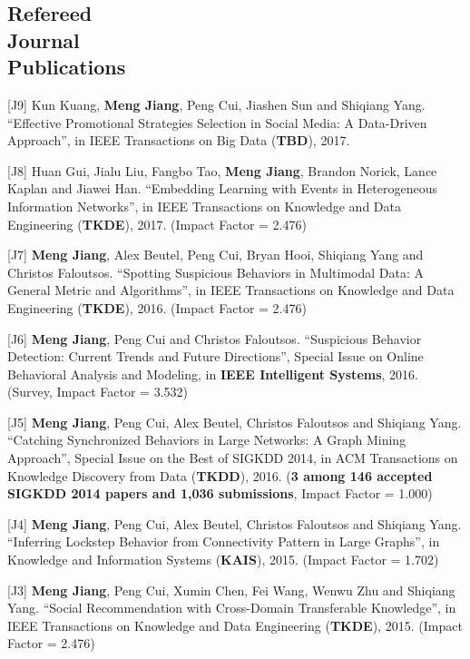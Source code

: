 \documentclass[margin, 9pt]{res}
\begin{document}
\begin{resume}

\section{Refereed \\ Journal \\ Publications}

[J9] Kun Kuang, \textbf{Meng Jiang}, Peng Cui, Jiashen Sun and Shiqiang Yang. ``Effective Promotional Strategies Selection in Social Media: A Data-Driven Approach'', in IEEE Transactions on Big Data (\textbf{TBD}), 2017.

[J8] Huan Gui, Jialu Liu, Fangbo Tao, \textbf{Meng Jiang}, Brandon Norick, Lance Kaplan and Jiawei Han. ``Embedding Learning with Events in Heterogeneous Information Networks'', in IEEE Transactions on Knowledge and Data Engineering (\textbf{TKDE}), 2017. (Impact Factor = 2.476)

[J7] \textbf{Meng Jiang}, Alex Beutel, Peng Cui, Bryan Hooi, Shiqiang Yang and Christos Faloutsos. ``Spotting Suspicious Behaviors in Multimodal Data: A General Metric and Algorithms'', in IEEE Transactions on Knowledge and Data Engineering (\textbf{TKDE}), 2016. (Impact Factor = 2.476)

[J6] \textbf{Meng Jiang}, Peng Cui and Christos Faloutsos. ``Suspicious Behavior Detection: Current Trends and Future Directions'', Special Issue on Online Behavioral Analysis and Modeling, in \textbf{IEEE Intelligent Systems}, 2016. (Survey, Impact Factor = 3.532)

[J5] \textbf{Meng Jiang}, Peng Cui, Alex Beutel, Christos Faloutsos and Shiqiang Yang. ``Catching Synchronized Behaviors in Large Networks: A Graph Mining Approach'', Special Issue on the Best of SIGKDD 2014, in ACM Transactions on Knowledge Discovery from Data (\textbf{TKDD}), 2016. (\textbf{3 among 146 accepted SIGKDD 2014 papers and 1,036 submissions}, Impact Factor = 1.000)

[J4] \textbf{Meng Jiang}, Peng Cui, Alex Beutel, Christos Faloutsos and Shiqiang Yang. ``Inferring Lockstep Behavior from Connectivity Pattern in Large Graphs'', in Knowledge and Information Systems (\textbf{KAIS}), 2015. (Impact Factor = 1.702)

[J3] \textbf{Meng Jiang}, Peng Cui, Xumin Chen, Fei Wang, Wenwu Zhu and Shiqiang Yang. ``Social Recommendation with Cross-Domain Transferable Knowledge'', in IEEE Transactions on Knowledge and Data Engineering (\textbf{TKDE}), 2015. (Impact Factor = 2.476)


\end{resume}
\end{document}
